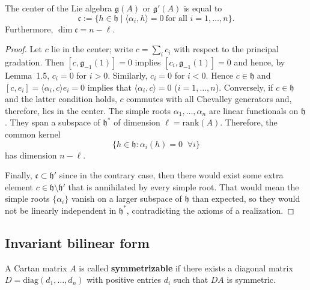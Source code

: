 \documentclass[12pt]{article}
\begin{document}
\begin{proposition}
    The center of the Lie algebra $\mathfrak{g}(A)$ or $\mathfrak{g}'(A)$ is equal to
    \[
        \mathfrak{c} := \{ h \in \mathfrak{h} \mid \langle \alpha_i, h \rangle = 0
        \ \text{for all } i=1,\dots,n \}.
    \]
    Furthermore, $\dim \mathfrak{c} = n-\ell$.
\end{proposition}

\begin{proof}
    Let $c$ lie in the center; write $c = \sum_i c_i$ with respect to the principal
    gradation. Then $[c,\mathfrak{g}_{-1}(1)] = 0$ implies
    $[c_i,\mathfrak{g}_{-1}(1)] = 0$ and hence, by Lemma~1.5, $c_i = 0$ for $i>0$.
    Similarly, $c_i=0$ for $i<0$. Hence $c \in \mathfrak{h}$ and
    $[c,e_i] = \langle \alpha_i,c \rangle e_i = 0$ implies that
    $\langle \alpha_i,c \rangle = 0$ ($i=1,\dots,n$). Conversely, if $c \in \mathfrak{h}$
    and the latter condition holds, $c$ commutes with all Chevalley generators and, therefore, lies in the center. The simple roots $\alpha_1,\dots,\alpha_n$ are linear functionals on $\mathfrak{h}$. They span a subspace of $\mathfrak{h}^*$ of dimension $\ell = \mathrm{rank}(A)$. Therefore, the common kernel
    \[
        \{ h \in \mathfrak{h} : \alpha_i(h)=0 \;\;\forall i\}
    \]
    has dimension $n-\ell$.

    Finally, $\mathfrak{c} \subset \mathfrak{h}'$ since in the contrary case, then there would exist some extra element $c \in \mathfrak{h} \setminus \mathfrak{h}'$ that is annihilated by every simple root. That would mean the simple roots $\{\alpha_i\}$ vanish on a larger subspace of $\mathfrak{h}$ than expected, so they would not be linearly independent in $\mathfrak{h}^*$, contradicting the axioms of a realization.
\end{proof}

\subsection{Invariant bilinear form}
\begin{definition}
    A Cartan matrix $A$ is called \textbf{symmetrizable} if there exists a diagonal matrix $D = \mathrm{diag}(d_1,\dots,d_n)$ with positive entries $d_i$ such that $DA$ is symmetric.
\end{definition}
\end{document}
